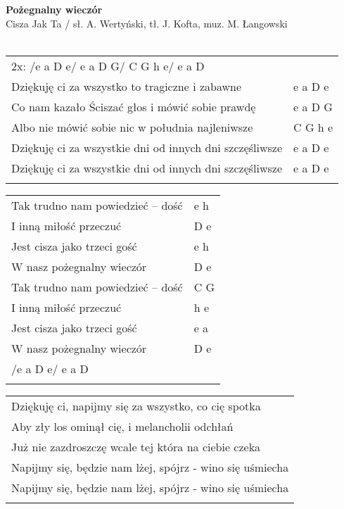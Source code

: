 \documentclass[a5paper]{article}
\begin{document}


\noindent
\fontsize{12pt}{15pt}\selectfont
\textbf{Pożegnalny wieczór} \\
\fontsize{8pt}{10pt}\selectfont
Cisza Jak Ta / sł. A. Wertyński, tł. J. Kofta, muz. M. Łangowski \\ \\
\fontsize{10pt}{12pt}\selectfont
{}
\begin{tabular}{@{}p{9.00cm}p{3cm}@{}}
\noindent
2x: /e a D e/ e a D G/ C G h e/ e a D & \\
Dziękuję ci za wszystko to tragiczne i zabawne & e a D e \\
Co nam kazało Ściszać głos i mówić sobie prawdę & e a D G \\
Albo nie mówić sobie nic w południa najleniwsze & C G h e \\
Dziękuję ci za wszystkie dni od innych dni szczęśliwsze & e a D e \\
Dziękuję ci za wszystkie dni od innych dni szczęśliwsze & e a D e \\ \\
\end{tabular}

\noindent
\begin{tabular}{@{}p{8.00cm}p{3cm}@{}}
Tak trudno nam powiedzieć – dość & e h \\
I inną miłość przeczuć & D e \\
Jest cisza jako trzeci gość & e h \\
W nasz pożegnalny wieczór & D e \\
Tak trudno nam powiedzieć – dość & C G \\
I inną miłość przeczuć & h e \\
Jest cisza jako trzeci gość & e a \\
W nasz pożegnalny wieczór & D e \\
/e a D e/ e a D & \\ \\
\end{tabular}

\noindent
\begin{tabular}{@{}p{9.00cm}@{}}
Dziękuję ci, napijmy się za wszystko, co cię spotka \\
Aby zły los ominął cię, i melancholii odchłań \\
Już nie zazdroszczę wcale tej która na ciebie czeka \\
Napijmy się, będzie nam lżej, spójrz - wino się uśmiecha \\
Napijmy się, będzie nam lżej, spójrz - wino się uśmiecha \\ \\
\end{tabular}
\end{document}
